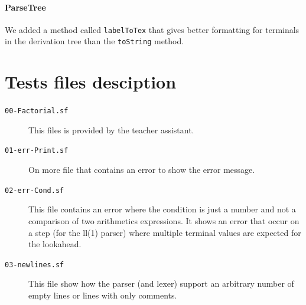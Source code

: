 \documentclass[12pt]{article}
\begin{document}
\paragraph{ParseTree}
We added a method called \texttt{labelToTex} that gives better formatting for terminals in the 
derivation tree than the \texttt{toString} method.


\section{Tests files desciption}

\begin{description}
    \item[\texttt{00-Factorial.sf}] This files is provided by the teacher assistant.
    \item[\texttt{01-err-Print.sf}] On more file that contains an error
    to show the error message.
    \item[\texttt{02-err-Cond.sf}] 
        This file contains an error where the condition is
        just a number and not a comparison of two arithmetics expressions.
        It shows an error that occur on a step (for the ll(1) parser)
        where multiple terminal values are expected for the lookahead.
    \item[\texttt{03-newlines.sf}] This file show how the parser
        (and lexer) support an arbitrary number of empty lines or lines with only comments. 
\end{description}
\end{document}
